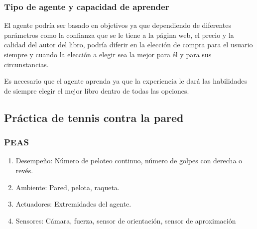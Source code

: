 \documentclass{article}
\begin{document}
            \subsubsection{Tipo de agente y capacidad de aprender}
                El agente podría ser basado en objetivos ya que dependiendo de diferentes parámetros como la confianza que se le tiene a la página web, el precio y la calidad del autor del libro, podría diferir en la elección de compra para el usuario siempre y cuando la elección a elegir sea la mejor para él y para sus circunstancias.
                
                Es necesario que el agente aprenda ya que la experiencia le dará las habilidades de siempre elegir el mejor libro dentro de todas las opciones.

        \subsection{Práctica de tennis contra la pared}
            \subsubsection{PEAS}
            \begin{enumerate}
                \item Desempeño: Número de peloteo continuo, número de golpes con derecha o revés.
                \item Ambiente: Pared, pelota, raqueta.
                \item Actuadores: Extremidades del agente.
                \item Sensores: Cámara, fuerza, sensor de orientación, sensor de aproximación
            \end{enumerate}
\end{document}
